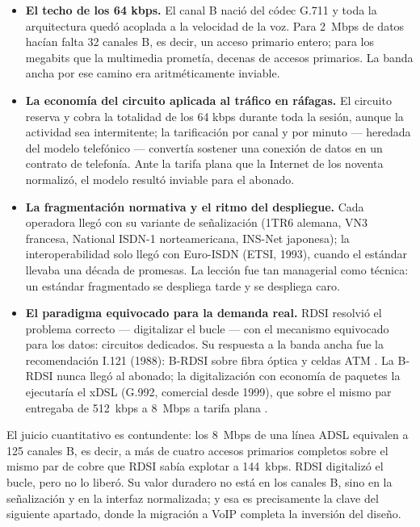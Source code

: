 \documentclass[12pt,a4paper]{article}
\begin{document}
\begin{itemize}
    \item \textbf{El techo de los 64 kbps.} El canal B nació del códec G.711 y toda la arquitectura quedó acoplada a la velocidad de la voz. Para 2~Mbps de datos hacían falta 32 canales B, es decir, un acceso primario entero; para los megabits que la multimedia prometía, decenas de accesos primarios. La banda ancha por ese camino era aritméticamente inviable.
    \item \textbf{La economía del circuito aplicada al tráfico en ráfagas.} El circuito reserva y cobra la totalidad de los 64 kbps durante toda la sesión, aunque la actividad sea intermitente; la tarificación por canal y por minuto --- heredada del modelo telefónico --- convertía sostener una conexión de datos en un contrato de telefonía. Ante la tarifa plana que la Internet de los noventa normalizó, el modelo resultó inviable para el abonado.
    \item \textbf{La fragmentación normativa y el ritmo del despliegue.} Cada operadora llegó con su variante de señalización (1TR6 alemana, VN3 francesa, National ISDN-1 norteamericana, INS-Net japonesa); la interoperabilidad solo llegó con Euro-ISDN (ETSI, 1993), cuando el estándar llevaba una década de promesas. La lección fue tan managerial como técnica: un estándar fragmentado se despliega tarde y se despliega caro.
    \item \textbf{El paradigma equivocado para la demanda real.} RDSI resolvió el problema correcto --- digitalizar el bucle --- con el mecanismo equivocado para los datos: circuitos dedicados. Su respuesta a la banda ancha fue la recomendación I.121 (1988): B-RDSI sobre fibra óptica y celdas ATM \cite{itui121}. La B-RDSI nunca llegó al abonado; la digitalización con economía de paquetes la ejecutaría el xDSL (G.992, comercial desde 1999), que sobre el mismo par entregaba de 512~kbps a 8~Mbps a tarifa plana \cite{tanenbaum2012}.
\end{itemize}

El juicio cuantitativo es contundente: los 8~Mbps de una línea ADSL equivalen a 125 canales B, es decir, a más de cuatro accesos primarios completos sobre el mismo par de cobre que RDSI sabía explotar a 144~kbps. RDSI digitalizó el bucle, pero no lo liberó. Su valor duradero no está en los canales B, sino en la señalización y en la interfaz normalizada; y esa es precisamente la clave del siguiente apartado, donde la migración a VoIP completa la inversión del diseño.

\end{document}
